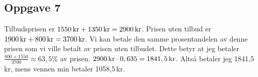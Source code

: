 \subsection*{Oppgave 7}
Tilbudsprisen er $1550\,\textrm{kr}+1350\,\textrm{kr}=2900\,\textrm{kr}$. Prisen uten tilbud er $1900\,\textrm{kr}+800\,\textrm{kr}=3700\,\textrm{kr}$. 
Vi kan betale den samme prosentandelen av denne prisen som vi ville betalt av prisen uten tilbudet. Dette betyr at jeg betaler $\frac{800+1550}{3700}\approx 63,5\%$ av prisen. $2900\,\textrm{kr}\cdot0,635=1841,5\,\textrm{kr}$. Altså betaler jeg 1841,5\,kr, mens vennen min betaler 1058,5\,kr.

